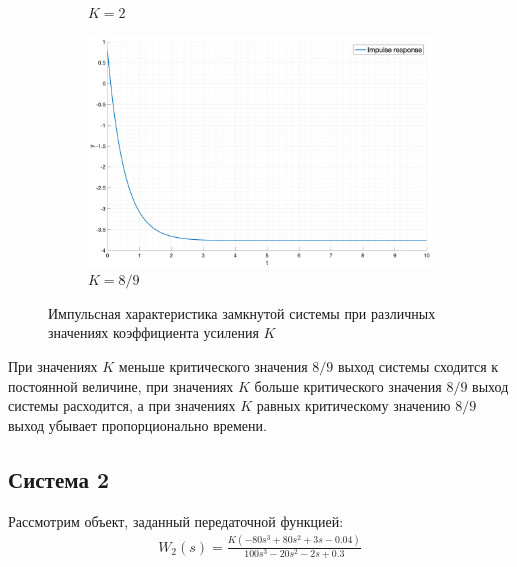 \begin{figure}[ht!]
\begin{subfigure}{0.5\textwidth}
        \caption{$K = 2$}
    \end{subfigure}%
    \begin{subfigure}{0.5\textwidth}
        \centering
        \includegraphics[width=\textwidth]{media/plots/task4_impulse_response_closed_5.png}
        \caption{$K = 8/9$}
    \end{subfigure}
    \caption{Импульсная характеристика замкнутой системы при различных значениях коэффициента усиления $K$}
    \label{fig:task4_impulse}
\end{figure}
При значениях $K$ меньше критического значения $8/9$ выход системы сходится к постоянной величине,
при значениях $K$ больше критического значения $8/9$ выход системы расходится, 
а при значениях $K$ равных критическому значению $8/9$ выход убывает пропорционально времени.

\subsection{Система 2}
Рассмотрим объект, заданный передаточной функцией:
\begin{eqnarray}
    W_2(s) = \frac{K(-80s^3+80s^2+3s-0.04)}{100s^3-20s^2-2s+0.3}
\end{eqnarray}

